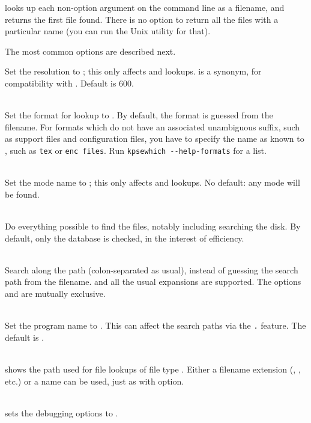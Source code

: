 \documentclass[12pt]{article}
\begin{document}
\KPS{} looks up each non-option argument on the command line as a
filename, and returns the first file found. There is no option to
return all the files with a particular name (you can run the Unix
 utility for that).

The most common options are described next.

\begin{ttdescription}
\item[\texttt{-{}-dpi=\var{num}}]\mbox{}
  Set the resolution to ; this only affects 
  and  lookups.   is a synonym, for compatibility
  with .  Default is 600.

\item[\texttt{-{}-format=\var{name}}]\mbox{}\\
  Set the format for lookup to .  By default, the
  format is guessed from the filename. For formats which do not have
  an associated unambiguous suffix, such as \MP{} support files and
   configuration files, you have to specify the name as
  known to \KPS{}, such as \texttt{tex} or \texttt{enc files}.  Run
  \texttt{kpsewhich -{}-help-formats} for a list.

\item[\texttt{-{}-mode=\var{string}}]\mbox{}\\
  Set the mode name to ; this only affects 
  and  lookups.  No default: any mode will be found.
\item[\texttt{-{}-must-exist}]\mbox{}\\
  Do everything possible to find the files, notably including
  searching the disk.  By default, only the  database is
  checked, in the interest of efficiency.
\item[\texttt{-{}-path=\var{string}}]\mbox{}\\
  Search along the path  (colon-separated as usual),
  instead of guessing the search path from the filename.  \samp{//} and
  all the usual expansions are supported.  The options 
  and  are mutually exclusive.
\item[\texttt{-{}-progname=\var{name}}]\mbox{}\\
  Set the program name to \texttt{}.
  This can affect the search paths via the \texttt{.}
  feature.
  The default is .
\item[\texttt{-{}-show-path=\var{name}}]\mbox{}\\
  shows the path used for file lookups of file type \texttt{}.
  Either a filename extension (, , etc.) or a
  name can be used, just as with  option.
\item[\texttt{-{}-debug=\var{num}}]\mbox{}\\
  sets the debugging options to \texttt{}.
\end{ttdescription}
\end{document}
